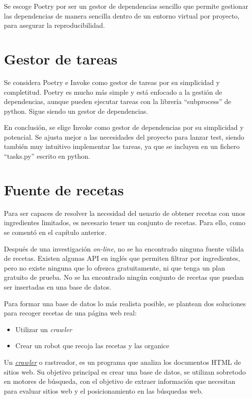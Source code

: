 Se escoge Poetry por ser un gestor de dependencias sencillo que permite gestionar las dependencias de manera sencilla dentro de un entorno virtual por proyecto, para asegurar la reproducibilidad.

\section{Gestor de tareas}
Se considera Poetry e Invoke como gestor de tareas por su simplicidad y completitud. Poetry es mucho más simple y está enfocado a la gestión de dependencias, aunque pueden ejecutar tareas con la librería ``subprocess'' de \Gls{python}. Sigue siendo un gestor de dependencias. 

En conclusión, se elige Invoke como gestor de dependencias por su simplicidad y potencial. Se ajusta mejor a las necesidades del proyecto para lanzar test, siendo también muy intuitivo implementar las tareas, ya que se incluyen en un fichero ``tasks.py'' escrito en \Gls{python}.

\section{Fuente de recetas}
Para ser capaces de resolver la necesidad del usuario de obtener recetas con unos ingredientes limitados, es necesario tener un conjunto de recetas. Para ello, como se comentó en el capítulo anterior. 

Después de una investigación \textit{on-line}, no se ha encontrado ninguna fuente válida de recetas. Existen algunas API en inglés que permiten filtrar por ingredientes, pero no existe ninguna que lo ofrezca gratuitamente, ni que tenga un plan gratuito de prueba. No se ha encontrado ningún conjunto de recetas que puedan ser insertadas en una base de datos. 

Para formar una base de datos lo más realista posible, se plantean dos soluciones para recoger recetas de una página web real: 
\begin{itemize}
    \item Utilizar un \textit{\gls{crawler}}
    \item Crear un robot que recoja las recetas y las organice 
\end{itemize}

Un \href{https://es.ryte.com/wiki/Crawler}{\textit{\gls{crawler}}} o rastreador, es un programa que analiza los documentos \gls{HTML} de sitios web. Su objetivo principal es crear una base de datos, se utilizan sobretodo en motores de búsqueda, con el objetivo de extraer información que necesitan para evaluar sitios web y el posicionamiento en las búsquedas web.

